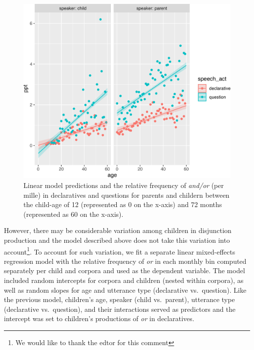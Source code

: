 \documentclass[
  english,
  ,man,floatsintext]{apa6}
\begin{document}
\begin{figure}[tb]

{\centering \includegraphics{figs/disjunctionPrediction-1} 

}

\caption{Linear model predictions and the relative frequency of \textit{and/or} (per mille) in declaratives and questions for parents and childern between the child-age of 12 (represented as 0 on the x-axis) and 72 months (represented as 60 on the x-axis).}\label{fig:disjunctionPrediction}
\end{figure}

However, there may be considerable variation among children in disjunction production and the model described above does not take this variation into account\footnote{We would like to thank the edtor for this comment}. To account for such variation, we fit a separate linear mixed-effects regression model with the relative frequency of \emph{or} in each monthly bin computed separately per child and corpora and used as the dependent variable. The model included random intercepts for corpora and children (nested within corpora), as well as random slopes for age and utterance type (declarative vs.~question). Like the previous model, children's age, speaker (child vs.~parent), utterance type (declarative vs.~question), and their interactions served as predictors and the intercept was set to children's productions of \emph{or} in declaratives.
\end{document}
